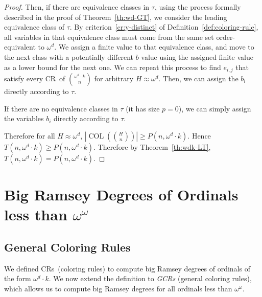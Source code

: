 \documentclass[11pt]{article}
\newcommand{\om}{\omega}
\newcommand{\oequiv}{\approx}
\newcommand{\COL}{\operatorname{COL}}
\newcommand{\crulenospace}{CR}
\newcommand{\crulesLong}{coloring rules}
\newcommand{\crule}{\crulenospace~}
\newcommand{\crules}{\crulenospace s~}
\newcommand{\capgencrules}{General Coloring Rules}
\newcommand{\gencrulenospace}{GCR}
\newcommand{\gencrulesLong}{general coloring rules}
\newcommand{\gencrulesnospace}{\gencrulenospace s}
\newcommand{\numpoints}{n}
\newcommand{\inumpoints}{i}
\newcommand{\idegr}{j}
\newcommand{\rareconst}{b}
\theoremstyle{plain}
\theoremstyle{definition}
\begin{document}
\begin{proof}
Then, if there are equivalence classes in $\tau$, using the process formally described in the proof of Theorem~\ref{th:wd-GT},
we consider the leading equivalence class of $\tau$. By criterion~\ref{cr:y-distinct} 
of Definition~\ref{def:coloring-rule}, all variables in that equivalence class 
must come from the same set order-equivalent to $\om^d$. We assign a finite value to 
that equivalence class, and move to the next class
with a potentially different $\rareconst$ value
using the assigned finite value as a lower bound for the next one. We can repeat this process to find $e_{\inumpoints,\idegr}$ that satisfy every \crule of $\binom{\om^d \cdot k}{\numpoints}$ for arbitrary $H \oequiv \om^{d}$. Then, we can assign the $\rareconst_{\inumpoints}$ directly according to $\tau$.

If there are no equivalence classes in $\tau$ (it has size $p=0$), we can simply assign the variables $\rareconst_{\inumpoints}$ directly according to $\tau$.

Therefore for all $H \oequiv \omega^d$,
$\left|\COL\left(\binom{H}{\numpoints}\right)\right|\geq P(\numpoints,\om^d\cdot k)$. Hence $T(\numpoints,\om^d\cdot k) \geq P\left(\numpoints, \om^d\cdot k\right)$. Therefore by Theorem~\ref{th:wdk-LT}, $T(\numpoints,\om^d \cdot k) = P(\numpoints,\om^d \cdot k)$.
\end{proof}

\section{Big Ramsey Degrees of Ordinals less than \texorpdfstring{$\om^\om$}{omega omega}}\label{se:done}

\subsection{\capgencrules}
We defined \crules (\crulesLong) to compute big Ramsey degrees of ordinals of the form $\om^d \cdot k$. We
now extend the definition to \textit{\gencrulesnospace} (\gencrulesLong), which allows us to compute big Ramsey degrees for all ordinals less than $\om^\om$.
\end{document}
